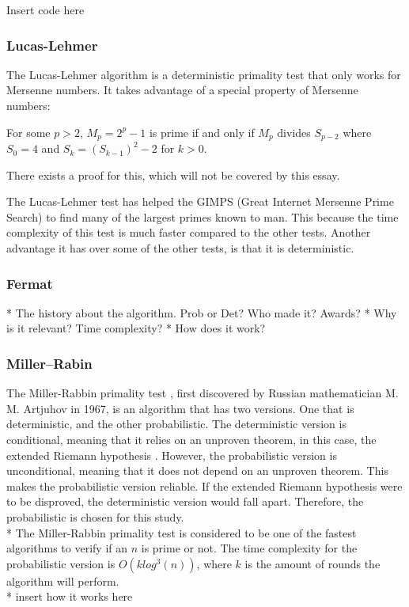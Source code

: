 \documentclass[main.tex]{subfiles}
\begin{document}
\begin{python}
    Insert code here
\end{python}

\subsubsection{Lucas-Lehmer}
The Lucas-Lehmer algorithm is a deterministic primality test that only works for Mersenne numbers. It takes advantage of a special property of Mersenne numbers:

\begin{mdframed}
    For some $p>2$, $M_p=2^p-1$ is prime if and only if $M_p$ divides $S_{p-2}$ where $S_0=4$ and $S_k=(S_{k-1})^2-2$ for $k>0$. 
\end{mdframed}

There exists a proof for this, which will not be covered by this essay.

The Lucas-Lehmer test has helped the GIMPS (Great Internet Mersenne Prime Search) to find many of the largest primes known to man. This because the time complexity of this test is much faster compared to the other tests. Another advantage it has over some of the other tests, is that it is deterministic.

\subsubsection{Fermat}
* The history about the algorithm. Prob or Det? Who made it? Awards?
* Why is it relevant? Time complexity?
* How does it work?


\subsubsection{Miller–Rabin}
The Miller-Rabbin primality test \cite{algh:miller}, first discovered by Russian
mathematician M. M. Artjuhov in 1967, is an algorithm that has two versions. One
that is deterministic, and the other probabilistic. The deterministic version is
conditional, meaning that it relies on an unproven theorem, in this case, the
extended Riemann hypothesis \cite{riemann}. However, the probabilistic version is
unconditional, meaning that it does not depend on an unproven theorem. This
makes the probabilistic version reliable. If the extended Riemann
hypothesis were to be disproved, the deterministic version would fall apart.
Therefore, the probabilistic is chosen for this study.
\newline
\\*
The Miller-Rabbin primality test is considered to be one of the fastest
algorithms to verify if an $n$ is prime or not. The time complexity for the
probabilistic version is $O(k log^{3}(n))$, where $k$ is the amount of rounds
the algorithm will perform. 
\newline
\\*
insert how it works here
\end{document}
